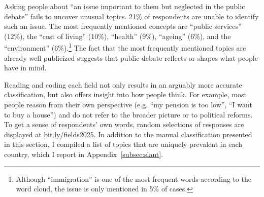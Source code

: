 \documentclass[12pt,english]{article}
\begin{document}
\begin{bibunit}
Asking people about ``an issue important to them but neglected in the public debate'' fails to uncover unusual topics. 21\% of respondents are unable to identify such an issue. %
The most frequently mentioned concepts are ``public services'' (12\%), the ``cost of living'' (10\%), ``health'' (9\%), ``ageing'' (6\%), and the ``environment'' (6\%).\footnote{Although ``immigration'' is one of the most frequent words according to the word cloud, the issue is only mentioned in 5\% of cases.} 
The fact that the most frequently mentioned topics are already well-publicized suggests that public debate reflects or shapes what people have in mind. %

Reading and coding each field not only results in an arguably more accurate classification, but also offers insight into how people think. 
For example, most people reason from their own perspective (e.g. ``my pension is too low'', ``I want to buy a house'') and do not refer to the broader picture or to political reforms. %
To get a sense of respondents' own words, random selections of responses are displayed at \href{http://preferences-pol.fr/fields2025.html}{bit.ly/fields2025}. %
In addition to the manual classification presented in this section, I compiled a list of topics that are uniquely prevalent in each country, which I report in Appendix~\ref{subsec:slant}. 


\end{bibunit}
\end{document}
